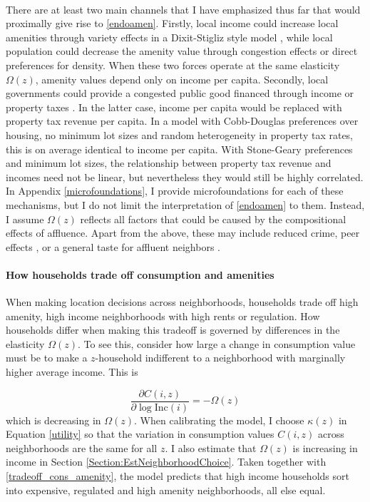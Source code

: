 \documentclass[12pt]{article}
\begin{document}
	 \paragraph*{}
	There are at least two main channels that I have emphasized thus far that would proximally give rise to \eqref{endoamen}. Firstly, local income could increase local amenities through variety effects in a Dixit-Stigliz style model \citep{AlmagroDI, Coutureetal}, while local population could decrease the amenity value through congestion effects or direct preferences for density. When these two forces operate at the same elasticity $\Omega(z)$, amenity values depend only on income per capita. Secondly, local governments could provide a congested public good financed through income or property taxes \citep{calabresetal, ineffTiebout}. In the latter case, income per capita would be replaced with property tax revenue per capita. In a model with Cobb-Douglas preferences over housing, no minimum lot sizes and random heterogeneity in property tax rates, this is on average identical to income per capita. With Stone-Geary preferences and minimum lot sizes, the relationship between property tax revenue and incomes need not be linear, but nevertheless they would still be highly correlated. In Appendix \ref{microfoundations}, I provide microfoundations for each of these mechanisms, but I do not limit the interpretation of \eqref{endoamen} to them. Instead, I assume $\Omega(z)$ reflects all factors that could be caused by the compositional effects of affluence. Apart from the above, these may include reduced crime, peer effects \citep{chettyhendren}, or a general taste for affluent neighbors \citep{ghh2013, parispoor}. 

	
	\paragraph*{How households trade off consumption and amenities} When making location decisions across neighborhoods, households trade off high amenity, high income neighborhoods with high rents or regulation. How households differ when making this tradeoff is governed by differences in the elasticity $\Omega(z)$. To see this, consider how large a change in consumption value must be to make a $z$-household indifferent to a neighborhood with marginally higher average income. This is 
	
	\begin{equation}\label{tradeoff_cons_amenity}
		\frac{\partial C(i, z)}{\partial \log \text{Inc}(i)} = -\Omega(z)
	\end{equation} 
	which is decreasing in $\Omega(z)$. When calibrating the model, I choose $\kappa(z)$ in Equation \eqref{utility} so that the variation in consumption values $C(i, z)$ across neighborhoods are the same for all $z$. I also estimate that $\Omega(z)$ is increasing in income in Section \ref{Section:EstNeighborhoodChoice}. Taken together with \eqref{tradeoff_cons_amenity}, the model predicts that high income households sort into expensive, regulated and high amenity neighborhoods, all else equal. 
	
\end{document}
